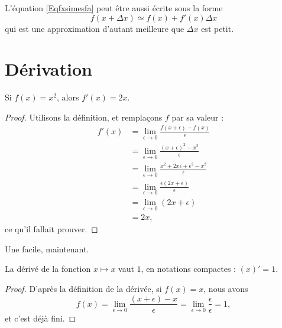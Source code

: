 L'équation \eqref{Eqfxsimesfa} peut être aussi écrite sous la forme
\begin{equation}		\label{EqfxdxSimeqfxfpx}
	f(x+\Delta x)\simeq f(x)+f'(x)\Delta x
\end{equation}
qui est une approximation d'autant meilleure que $\Delta x$ est petit.

\section{Dérivation}

\begin{lemma}           \label{LemDeccCarr}
    Si $f(x)=x^2$, alors $f'(x)=2x$.
\end{lemma}

\begin{proof}
    Utilisons la définition, et remplaçons $f$ par sa valeur :
    \begin{subequations}
        \begin{align}
            f'(x)   &=\lim_{\epsilon\to 0}\frac{ f(x+\epsilon)-f(x) }{ \epsilon }\\
                &=\lim_{\epsilon\to 0}\frac{ (x+\epsilon)^2-x^2 }{ \epsilon }\\
                &=\lim_{\epsilon\to 0}\frac{ x^2+2x\epsilon+\epsilon^2-x^2 }{ \epsilon }\\
                &=\lim_{\epsilon\to 0}\frac{\epsilon(2x+\epsilon)}{ \epsilon }\\
                &=\lim_{\epsilon\to 0}(2x+\epsilon)\\
                &=2x,
        \end{align}
    \end{subequations}
    ce qu'il fallait prouver.
\end{proof}

Une facile, maintenant.
\begin{proposition}
    La dérivé de la fonction $x\mapsto x$ vaut $1$, en notations compactes : $(x)'=1$.
\end{proposition}

\begin{proof}
D'après la définition de la dérivée, si $f(x)=x$, nous avons
\begin{equation}
    f(x)=\lim_{\epsilon\to 0}\frac{ (x+\epsilon) -x }{\epsilon} =\lim_{\epsilon\to 0}\frac{ \epsilon }{\epsilon} =1,
\end{equation}
et c'est déjà fini.
\end{proof}

